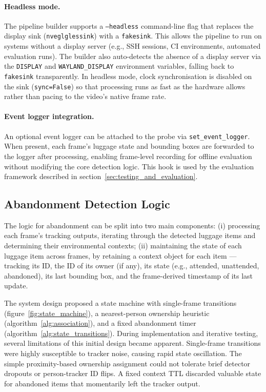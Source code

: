 \paragraph{Headless mode.}

The pipeline builder supports a \texttt{--headless} command-line flag that
replaces the display sink (\texttt{nveglglessink}) with a \texttt{fakesink}.
This allows the pipeline to run on systems without a display server (e.g., SSH
sessions, CI environments, automated evaluation runs). The builder also
auto-detects the absence of a display server via the \texttt{DISPLAY} and
\texttt{WAYLAND\_DISPLAY} environment variables, falling back to
\texttt{fakesink} transparently. In headless mode, clock synchronisation is
disabled on the sink (\texttt{sync=False}) so that processing runs as fast as
the hardware allows rather than pacing to the video's native frame rate.

\paragraph{Event logger integration.}

An optional event logger can be attached to the probe via
\texttt{set\_event\_logger}. When present, each frame's luggage state and
bounding boxes are forwarded to the logger after processing, enabling
frame-level recording for offline evaluation without modifying the core
detection logic. This hook is used by the evaluation framework described in
section~\ref{sec:testing_and_evaluation}.

\subsection{Abandonment Detection Logic}

The logic for abandonment can be split into two main components: (i) processing
each frame's tracking outputs, iterating through the detected luggage items and
determining their environmental contexts; (ii) maintaining the state of each
luggage item across frames, by retaining a context object for each item ---
tracking its ID, the ID of its owner (if any), its state (e.g., attended,
unattended, abandoned), its last bounding box, and the frame-derived timestamp
of its last update.

The system design proposed a state machine with single-frame transitions
(figure~\ref{fig:state_machine}), a nearest-person ownership heuristic
(algorithm~\ref{alg:association}), and a fixed abandonment timer
(algorithm~\ref{alg:state_transitions}). During implementation and iterative
testing, several limitations of this initial design became apparent.
Single-frame transitions were highly susceptible to tracker noise, causing
rapid state oscillation. The simple proximity-based ownership assignment could
not tolerate brief detector dropouts or person-tracker ID flips. A fixed
context TTL discarded valuable state for abandoned items that momentarily left
the tracker output.

